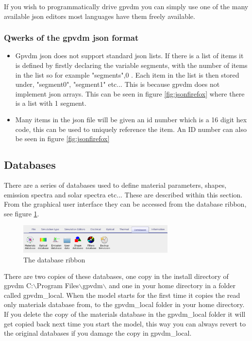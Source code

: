 If you wish to programmatically drive gpvdm you can simply use one of the many available json editors most languages have them freely available. 

\subsubsection{Qwerks of the gpvdm json format}
\begin{itemize}
  \item Gpvdm json does not support standard json lists.  If there is a list of items it is defined by firstly declaring the variable segments, with the number of items in the list so for example "segments",0 . Each item in the list is then stored under, "segment0", "segment1" etc... This is because gpvdm does not implement json arrays.  This can be seen in figure \ref{fig:jsonfirefox} where there is a list with 1 segment.
  \item Many items in the json file will be given an id number which is a 16 digit hex code, this can be used to uniquely reference the item. An ID number can also be seen in figure \ref{fig:jsonfirefox}
\end{itemize}



\subsection{Databases}



There are a series of databases used to define material parameters, shapes, emission spectra and solar spectra etc...  These are described within this section.  From the graphical user interface they can be accessed from the database ribbon, see figure \ref{fig:database}.

\begin{figure}[H]
\centering
\includegraphics[width=0.7\textwidth]{./images/database_ribbon.png}
\caption{The database ribbon}
\label{fig:database}
\end{figure}

There are two copies of these databases, one copy in the install directory of gpvdm  C:$\backslash$Program Files$\backslash$gpvdm$\backslash$ and one in your home directory in a folder called gpvdm\_local.   When the model starts for the first time it copies the read only materials database from, to the gpvdm\_local folder in your home directory.  If you delete the copy of the materials database in the gpvdm\_local folder it will get copied back next time you start the model, this way you can always revert to the original databases if you damage the copy in gpvdm\_local.

